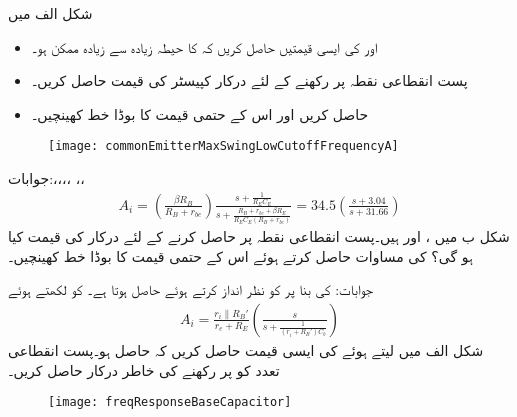 شکل  الف میں
\begin{itemize}
\item
{} اور  کی ایسی قیمتیں حاصل کریں کہ  کا حیطہ زیادہ سے زیادہ ممکن ہو۔
\item
پست انقطاعی نقطہ  پر رکھنے کے لئے درکار کپیسٹر  کی  قیمت حاصل کریں۔
\item
{} حاصل کریں اور اس کے حتمی قیمت کا بوڈا خط کھینچیں۔
\end{itemize}
%
\begin{figure}
\centering
\texttt{[image: commonEmitterMaxSwingLowCutoffFrequencyA]}
\caption{}
\label{شکل_تعددی_ردعمل_سوال_دائرہ_انقطاعی_نکتہ_الف}
\end{figure}
%

جوابات:،،،، ،،
\begin{align*}
A_i=\left(\frac{\beta R_B }{R_B+r_{be}}\right) \frac{s+\frac{1}{R_E C_E}}{s+\frac{R_B+r_{be}+\beta R_E}{R_E C_E \left(R_B+r_{be} \right)}}=34.5 \left(\frac{s+3.04}{s+31.66} \right)
\end{align*}
شکل  ب میں ، اور  ہیں۔پست انقطاعی نقطہ  پر حاصل کرنے کے لئے درکار  کی قیمت کیا ہو گی؟  کی مساوات حاصل کرتے ہوئے اس کے حتمی قیمت کا بوڈا خط کھینچیں۔

جوابات: کی بنا پر  کو نظر انداز کرتے ہوئے  حاصل ہوتا ہے۔ کو  لکھتے ہوئے
\begin{align*}
A_i=\frac{r_i \mathbin{\|} R_B'}{r_e+R_E} \left(\frac{s}{s+\frac{1}{\left(r_i+R_B' \right) C_b}} \right)
\end{align*}
شکل  الف میں  لیتے ہوئے  کی ایسی قیمت حاصل کریں کہ  حاصل ہو۔پست انقطاعی تعدد کو  پر رکھنے کی خاطر درکار  حاصل کریں۔
\begin{figure}
\centering
\texttt{[image: freqResponseBaseCapacitor]}
\caption{}
\label{شکل_تعددی_ردعمل_سوال_قابو_کپیسٹر_منفی_منبع}
\end{figure}

